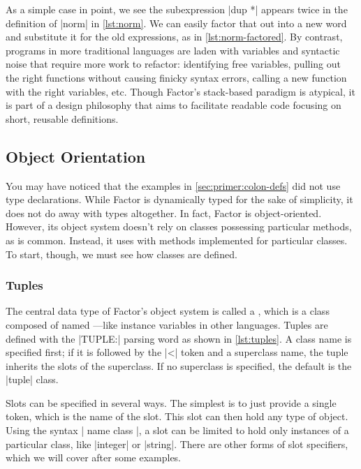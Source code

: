 
As a simple case in point, we see the subexpression \factor|dup *| appears
twice in the definition of \factor|norm| in \cref{lst:norm}.  We can easily
factor that out into a new word and substitute it for the old expressions, as
in \cref{lst:norm-factored}.  By contrast, programs in more traditional
languages are laden with variables and syntactic noise that require more work
to refactor: identifying free variables, pulling out the right functions
without causing finicky syntax errors, calling a new function with the right
variables, etc.  Though Factor's stack-based paradigm is atypical, it is part
of a design philosophy that aims to facilitate readable code focusing on short,
reusable definitions.

\subsection{Object Orientation}

You may have noticed that the examples in \cref{sec:primer:colon-defs} did not
use type declarations.  While Factor is dynamically typed for the sake of
simplicity, it does not do away with types altogether.  In fact, Factor is
object-oriented.  However, its object system doesn't rely on classes possessing
particular methods, as is common.  Instead, it uses  with
methods implemented for particular classes.  To start, though, we must see how
classes are defined.

\subsubsection{Tuples}


The central data type of Factor's object system is called a , which
is a class composed of named ---like instance variables in other
languages.  Tuples are defined with the \factor|TUPLE:| parsing word as shown
in \cref{lst:tuples}.  A class name is specified first; if it is followed by
the \factor|<| token and a superclass name, the tuple inherits the slots of the
superclass.  If no superclass is specified, the default is the \factor|tuple|
class.

Slots can be specified in several ways.  The simplest is to just provide a
single token, which is the name of the slot.  This slot can then hold any type
of object.  Using the syntax
%
\factor|{ name class }|,
%
a slot can be limited to hold only instances of a particular class, like
\factor|integer| or \factor|string|.  There are other forms of slot specifiers,
which we will cover after some examples.

